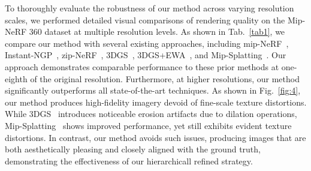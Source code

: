 To thoroughly evaluate the robustness of our method across varying resolution scales, we performed detailed visual comparisons of rendering quality on the Mip-NeRF 360 dataset at multiple resolution levels.
As shown in Tab.~\ref{tab1}, we compare our method with several existing approaches, including mip-NeRF~\cite{Mip-NeRF360}, Instant-NGP~\cite{InstantNGP}, zip-NeRF~\cite{zip-nrf}, 3DGS~\cite{3dgs}, 3DGS+EWA~\cite{EWV}, and Mip-Splatting~\cite{mip360-splatting}. 
Our approach demonstrates comparable performance to these prior methods at one-eighth of the original resolution. 
Furthermore, at higher resolutions, our method significantly outperforms all state-of-the-art techniques.
As shown in Fig.~\ref{fig:4}, our method produces high-fidelity imagery devoid of fine-scale texture distortions.
While 3DGS~\cite{3dgs} introduces noticeable erosion artifacts due to dilation operations, Mip-Splatting~\cite{mip360-splatting} shows improved performance, yet still exhibits evident texture distortions. In contrast, our method avoids such issues, producing images that are both aesthetically pleasing and closely aligned with the ground truth, demonstrating the effectiveness of our hierarchicall refined strategy.




